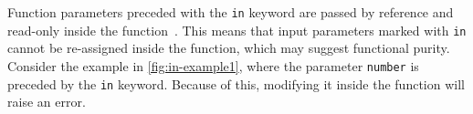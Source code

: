 \documentclass[a4paper,12pt]{article}
\begin{document}


Function parameters preceded with the \texttt{in} keyword are passed by reference and read-only inside the function~\cite{microsoft-in-modifier}. This means that input parameters marked with \texttt{in} cannot be re-assigned inside the function, which may suggest functional purity. Consider the example in \autoref{fig:in-example1}, where the parameter \texttt{number} is preceded by the \texttt{in} keyword. Because of this, modifying it inside the function will raise an error.
\end{document}
